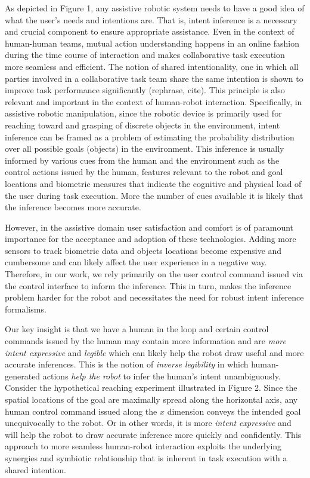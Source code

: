 As depicted in Figure 1, any assistive robotic system needs to have a good idea of what the user's needs and intentions are. That is, intent inference is a necessary and crucial component to ensure appropriate assistance. Even in the context of human-human teams, mutual action understanding happens in an online fashion during the time course of interaction and makes collaborative task execution more seamless and efficient. The notion of shared intentionality, one in which all parties involved in a collaborative task team share the same intention is shown to improve task performance significantly (rephrase, cite). This principle is also relevant and important in the context of human-robot interaction. Specifically, in assistive robotic manipulation, since the robotic device is primarily used for reaching toward and grasping of discrete objects in the environment, intent inference can be framed as a problem of estimating the probability distribution over all possible goals (objects) in the environment. This inference is usually informed by various cues from the human and the environment such as the control actions issued by the human, features relevant to the robot and goal locations and biometric measures that indicate the cognitive and physical load of the user during task execution. More the number of cues available it is likely that the inference becomes more accurate. 

However, in the assistive domain user satisfaction and comfort is of paramount importance for the acceptance and adoption of these technologies. Adding more sensors to track biometric data and objects locations become expensive and cumbersome and can likely affect the user experience in a negative way. Therefore, in our work, we rely primarily on the user control command issued via the control interface to inform the inference. This in turn, makes the inference problem harder for the robot and necessitates the need for robust intent inference formalisms. 

Our key insight is that we have a human in the loop and certain control commands issued by the human may contain more information and are \textit{more intent expressive} and \textit{legible} which can likely help the robot draw useful and more accurate inferences. This is the notion of \textit{inverse legibility} in which human-generated actions \textit{help the robot} to infer the human's intent unambiguously. Consider the hypothetical reaching experiment illustrated in Figure 2. Since the spatial locations of the goal are maximally spread along the horizontal axis, any human control command issued along the $x$ dimension conveys the intended goal unequivocally to the robot. Or in other words, it is more \textit{intent expressive} and will help the robot to draw accurate inference more quickly and confidently. This approach to more seamless human-robot interaction exploits the underlying synergies and symbiotic relationship that is inherent in task execution with a shared intention. 

